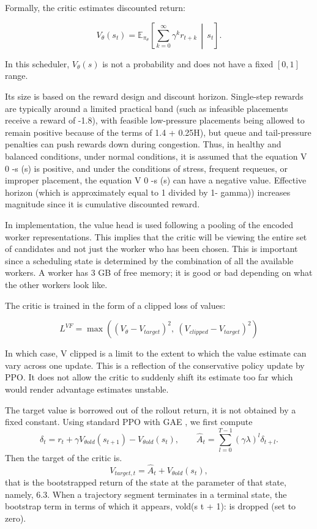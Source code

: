 Formally, the critic estimates discounted return:

\[
V_\theta(s_t)=\mathbb{E}_{\pi_\theta}\left[\sum_{k=0}^{\infty}\gamma^k r_{t+k}\,\middle|\,s_t\right].
\]

In this scheduler, \(V_\theta(s)\) is not a probability and does not have a fixed \([0,1]\) range. 

Its size is based on the reward design and discount horizon. Single-step rewards are typically around a limited practical band (such as infeasible placements receive a reward of -1.8), with feasible low-pressure placements being allowed to remain positive because of the terms of 1.4 + 0.25H), but queue and tail-pressure penalties can push rewards down during congestion. Thus, in healthy and balanced conditions, under normal conditions, it is assumed that the equation V 0 -s (s) is positive, and under the conditions of stress, frequent requeues, or improper placement, the equation V 0 -s (s) can have a negative value. Effective horizon (which is approximately equal to 1 divided by 1- gamma)) increases magnitude since it is cumulative discounted reward.

In implementation, the value head is used following a pooling of the encoded worker representations. This implies that the critic will be viewing the entire set of candidates and not just the worker who has been chosen. This is important since a scheduling state is determined by the combination of all the available workers. A worker has 3 GB of free memory; it is good or bad depending on what the other workers look like.

The critic is trained in the form of a clipped loss of values:

\[
L^{VF} = \max\left((V_\theta - V_{target})^2,\ (V_{clipped} - V_{target})^2\right)
\]

In which case, V clipped is a limit to the extent to which the value estimate can vary across one update. This is a reflection of the conservative policy update by PPO. It does not allow the critic to suddenly shift its estimate too far which would render advantage estimates unstable.

The target value is borrowed out of the rollout return, it is not obtained by a fixed constant. Using standard PPO with GAE \cite{schulman2015gae}, we first compute
\[
\delta_t = r_t + \gamma V_{\theta old}(s_{t+1}) - V_{\theta old}(s_t), \qquad
\hat{A}_t = \sum_{l=0}^{T-1}(\gamma\lambda)^l \delta_{t+l}.
\]
Then the target of the critic is.
\[
V_{target,t} = \hat{A}_t + V_{\theta old}(s_t),
\]
that is the bootstrapped return of the state at the parameter of that state, namely, 6.3. When a trajectory segment terminates in a terminal state, the bootstrap term in terms of which it appears, vold(s t + 1): is dropped (set to zero).

